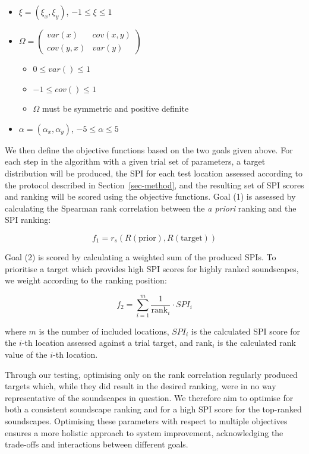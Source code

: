 \documentclass[
  authoryear,
  3p]{elsarticle}
\providecommand{\tightlist}{%
  \setlength{\itemsep}{0pt}\setlength{\parskip}{0pt}}\usepackage{longtable,booktabs,array}
\begin{document}
\begin{itemize}
\tightlist
\item
  \(\xi = (\xi_x, \xi_y)\), \(-1 \leq \xi \leq 1\)
\item
  \(\Omega = \begin{pmatrix} var(x) & cov(x, y) \\ cov(y, x) & var(y) \end{pmatrix}\)

  \begin{itemize}
  \tightlist
  \item
    \(0 \leq var() \leq 1\)
  \item
    \(-1 \leq cov() \leq 1\)
  \item
    \(\Omega\) must be symmetric and positive definite
  \end{itemize}
\item
  \(\alpha = (\alpha_x, \alpha_y)\), \(-5 \leq \alpha \leq 5\)
\end{itemize}

We then define the objective functions based on the two goals given
above. For each step in the algorithm with a given trial set of
parameters, a target distribution will be produced, the SPI for each
test location assessed according to the protocol described in
Section~\ref{sec-method}, and the resulting set of SPI scores and
ranking will be scored using the objective functions. Goal (1) is
assessed by calculating the Spearman rank correlation between the
\emph{a priori} ranking and the SPI ranking:

\[
f_1 = r_{s}(R(\text{prior}), R(\text{target}))
\]

Goal (2) is scored by calculating a weighted sum of the produced SPIs.
To prioritise a target which provides high SPI scores for highly ranked
soundscapes, we weight according to the ranking position:

\[
f_2 = \sum_{i=1}^m \frac{1}{\text{rank}_i} \cdot SPI_i
\]

where \(m\) is the number of included locations, \(SPI_i\) is the
calculated SPI score for the \(i\)-th location assessed against a trial
target, and \(\text{rank}_i\) is the calculated rank value of the
\(i\)-th location.

Through our testing, optimising only on the rank correlation regularly
produced targets which, while they did result in the desired ranking,
were in no way representative of the soundscapes in question. We
therefore aim to optimise for both a consistent soundscape ranking and
for a high SPI score for the top-ranked soundscapes. Optimising these
parameters with respect to multiple objectives ensures a more holistic
approach to system improvement, acknowledging the trade-offs and
interactions between different goals.
\end{document}
